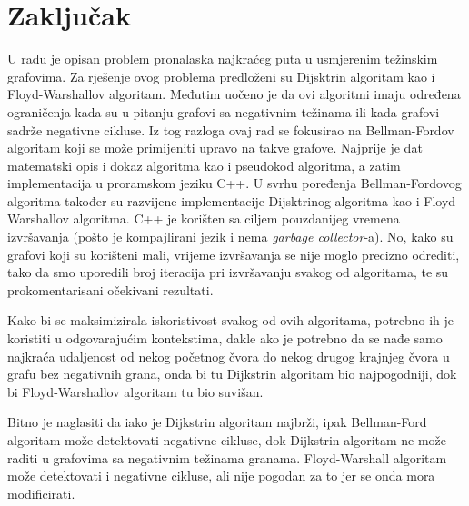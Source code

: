 \documentclass[conference]{IEEEtran}
\begin{document}
\section*{Zaključak}
U radu je opisan problem pronalaska najkraćeg puta u usmjerenim težinskim grafovima. Za rješenje ovog problema predloženi su Dijsktrin algoritam kao i Floyd-Warshallov algoritam. Međutim uočeno je da ovi algoritmi imaju određena ograničenja kada su u pitanju grafovi sa negativnim težinama ili kada grafovi sadrže negativne cikluse. Iz tog razloga ovaj rad se fokusirao na Bellman-Fordov algoritam koji se može primijeniti upravo na takve grafove. Najprije je dat matematski opis i dokaz algoritma kao i pseudokod algoritma, a zatim implementacija u proramskom jeziku C++. U svrhu poređenja Bellman-Fordovog algoritma također su razvijene implementacije Dijsktrinog algoritma kao i Floyd-Warshallov algoritma.  C++ je korišten sa ciljem pouzdanijeg vremena izvršavanja (pošto je kompajlirani jezik i nema \textit{garbage collector}-a). No, kako su grafovi koji su korišteni mali, vrijeme izvršavanja se nije moglo precizno odrediti, tako da smo uporedili broj iteracija pri izvršavanju svakog od algoritama, te su prokomentarisani očekivani rezultati.

Kako bi se maksimizirala iskoristivost svakog od ovih algoritama, potrebno ih je koristiti u odgovarajućim kontekstima, dakle ako je potrebno da se nađe samo najkraća udaljenost od nekog početnog čvora do nekog drugog krajnjeg čvora u grafu bez negativnih grana, onda bi tu Dijkstrin algoritam bio najpogodniji, dok bi Floyd-Warshallov algoritam tu bio suvišan.

Bitno je naglasiti da iako je Dijkstrin algoritam najbrži, ipak Bellman-Ford algoritam može detektovati negativne cikluse, dok Dijkstrin algoritam ne može raditi u grafovima sa negativnim težinama granama. Floyd-Warshall algoritam može detektovati i negativne cikluse, ali nije pogodan za to jer se onda mora modificirati.
\printbibliography
\end{document}
